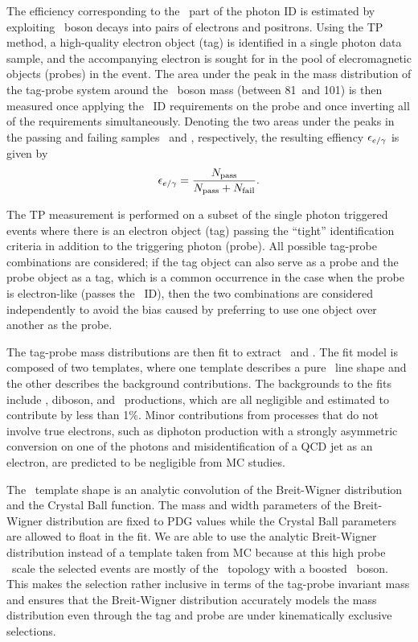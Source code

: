 The efficiency corresponding to the \egamma\ part of the photon ID is estimated by exploiting \PZ\ boson decays into pairs of electrons and positrons.
Using the TP method, a high-quality electron object (tag) is identified in a single photon data sample, and the accompanying electron is sought for in the pool of elecromagnetic objects (probes) in the event. 
The area under the peak in the mass distribution of the tag-probe system around the \PZ\ boson mass (between 81\GeV\ and 101\GeV) is then measured once applying the \Pe\Pgg\ ID requirements on the probe and once inverting all of the requirements simultaneously. 
Denoting the two areas under the peaks in the passing and failing samples \npass\ and \nfail, respectively, the resulting effiency $\epsilon_{{e}/\gamma}$ is given by
\begin{equation}
\epsilon_{{e}/\gamma} = \frac{N_{\text{pass}}}{N_{\text{pass}} + N_{\text{fail}}}.
\end{equation}

The TP measurement is performed on a subset of the single photon triggered events where there is an electron object (tag) passing the ``tight'' identification criteria in addition to the triggering photon (probe). 
All possible tag-probe combinations are considered; if the tag object can also serve as a probe and the probe object as a tag, which is a common occurrence in the case when the probe is electron-like (passes the \Pe\Pgg\ ID), then the two combinations are considered independently to avoid the bias caused by preferring to use one object over another as the probe.

The tag-probe mass distributions are then fit to extract \npass\ and \nfail. 
The fit model is composed of two templates, where one template describes a pure \Zee\ line shape and the other describes the background contributions. 
The backgrounds to the fits include \wj, diboson, and \ttbar\ productions, which are all negligible and estimated to contribute by less than 1\%. 
Minor contributions from processes that do not involve true electrons,
such as diphoton production with a strongly asymmetric conversion on
one of the photons and misidentification of a QCD jet as an electron,
are predicted to be negligible from MC studies. 
 
The \Zee\ template shape is an analytic convolution of the Breit-Wigner distribution and the Crystal Ball function. 
The mass and width parameters of the Breit-Wigner distribution are fixed to PDG values while the Crystal Ball parameters are allowed to float in the fit.
We are able to use the analytic Breit-Wigner distribution instead of a template taken from MC because at this high probe \pt\ scale the selected events are mostly of the \zj\ topology with a boosted \PZ\ boson.
This makes the selection rather inclusive in terms of the tag-probe
invariant mass and ensures that the Breit-Wigner distribution
accurately models the mass distribution even through the tag and probe
are under kinematically exclusive selections. 

